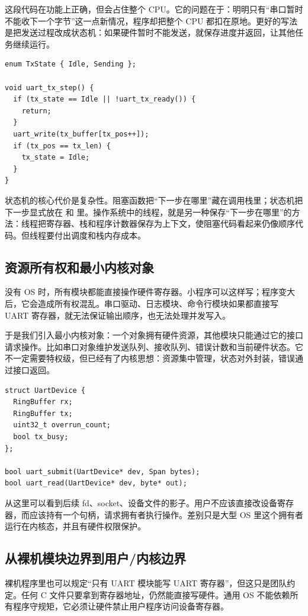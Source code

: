 这段代码在功能上正确，但会占住整个 CPU。它的问题在于：明明只有“串口暂时不能收下一个字节”这一点新情况，程序却把整个 CPU 都扣在原地。更好的写法是把发送过程改成状态机：如果硬件暂时不能发送，就保存进度并返回，让其他任务继续运行。

\begin{lstlisting}
enum TxState { Idle, Sending };

void uart_tx_step() {
  if (tx_state == Idle || !uart_tx_ready()) {
    return;
  }
  uart_write(tx_buffer[tx_pos++]);
  if (tx_pos == tx_len) {
    tx_state = Idle;
  }
}
\end{lstlisting}

状态机的核心代价是复杂性。阻塞函数把“下一步在哪里”藏在调用栈里；状态机把下一步显式放在  和  里。操作系统中的线程，就是另一种保存“下一步在哪里”的方法：线程把寄存器、栈和程序计数器保存为上下文，使阻塞代码看起来仍像顺序代码。但线程要付出调度和栈内存成本。

\subsection{资源所有权和最小内核对象}

没有 OS 时，所有模块都能直接操作硬件寄存器。小程序可以这样写；程序变大后，它会造成所有权混乱。串口驱动、日志模块、命令行模块如果都直接写 UART 寄存器，就无法保证输出顺序，也无法处理并发写入。

于是我们引入最小内核对象：一个对象拥有硬件资源，其他模块只能通过它的接口请求操作。比如串口对象维护发送队列、接收队列、错误计数和当前硬件状态。它不一定需要特权级，但已经有了内核思想：资源集中管理，状态对外封装，错误通过接口返回。

\begin{lstlisting}
struct UartDevice {
  RingBuffer rx;
  RingBuffer tx;
  uint32_t overrun_count;
  bool tx_busy;
};

bool uart_submit(UartDevice* dev, Span bytes);
bool uart_read(UartDevice* dev, byte* out);
\end{lstlisting}

从这里可以看到后续 fd、socket、设备文件的影子。用户不应该直接改设备寄存器，而应该持有一个句柄，请求拥有者执行操作。差别只是大型 OS 里这个拥有者运行在内核态，并且有硬件权限保护。

\subsection{从裸机模块边界到用户/内核边界}

裸机程序里也可以规定“只有 UART 模块能写 UART 寄存器”，但这只是团队约定。任何 C 文件只要拿到寄存器地址，仍然能直接写硬件。通用 OS 不能依赖所有程序守规矩，它必须让硬件禁止用户程序访问设备寄存器。

